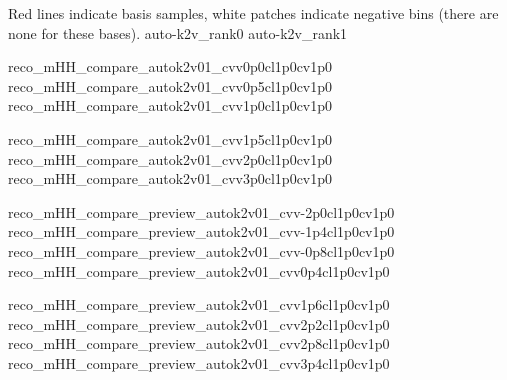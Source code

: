 {Red lines indicate basis samples, white patches indicate negative bins (there are none for these bases).}
{auto-k2v_rank0}
{auto-k2v_rank1}

{reco_mHH_compare_autok2v01_cvv0p0cl1p0cv1p0}
{reco_mHH_compare_autok2v01_cvv0p5cl1p0cv1p0}
{reco_mHH_compare_autok2v01_cvv1p0cl1p0cv1p0}

{reco_mHH_compare_autok2v01_cvv1p5cl1p0cv1p0}
{reco_mHH_compare_autok2v01_cvv2p0cl1p0cv1p0}
{reco_mHH_compare_autok2v01_cvv3p0cl1p0cv1p0}

{reco_mHH_compare_preview_autok2v01_cvv-2p0cl1p0cv1p0}
{reco_mHH_compare_preview_autok2v01_cvv-1p4cl1p0cv1p0}
{reco_mHH_compare_preview_autok2v01_cvv-0p8cl1p0cv1p0}
{reco_mHH_compare_preview_autok2v01_cvv0p4cl1p0cv1p0}

{reco_mHH_compare_preview_autok2v01_cvv1p6cl1p0cv1p0}
{reco_mHH_compare_preview_autok2v01_cvv2p2cl1p0cv1p0}
{reco_mHH_compare_preview_autok2v01_cvv2p8cl1p0cv1p0}
{reco_mHH_compare_preview_autok2v01_cvv3p4cl1p0cv1p0}

